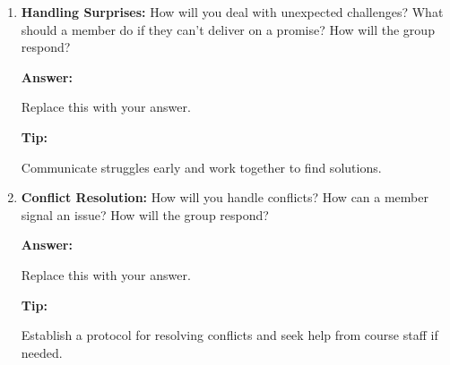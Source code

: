 \documentclass[12pt]{article}
\newenvironment{answer}[1][]{
  \color{blue}\textbf{Answer:}
}{}
\newenvironment{alice}[1][]{
  \color{black}\textbf{Tip:}
}{}
\begin{document}
\begin{enumerate}
\begin{answer}
Replace this with your answer.
\end{answer}

\begin{alice}

Communicate struggles early and work together to find solutions.
\end{alice}

\item {\bf Handling Surprises:} How will you deal with unexpected challenges? What should a member do if they can’t deliver on a promise? How will the group respond?

\begin{answer}

Replace this with your answer.
\end{answer}

\begin{alice}

Communicate struggles early and work together to find solutions.
\end{alice}

\item {\bf Conflict Resolution:} How will you handle conflicts? How can a member signal an issue? How will the group respond?

\begin{answer}

Replace this with your answer.
\end{answer}

\begin{alice}

Establish a protocol for resolving conflicts and seek help from course staff if needed.
\end{alice}

\end{enumerate}
\end{document}
